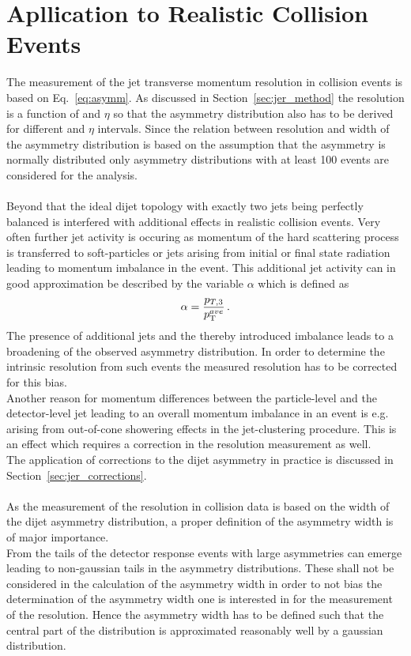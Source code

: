 \section{Apllication to Realistic Collision Events}
\label{sec:jer_application}
The measurement of the jet transverse momentum resolution in collision events is based on Eq.~\ref{eq:asymm}. As discussed in Section~\ref{sec:jer_method} the resolution is a function of \pt and $\eta$ so that the asymmetry distribution also has to be derived for different \pt and $\eta$ intervals. Since the relation between resolution and width of the asymmetry distribution is based on the assumption that the asymmetry is normally distributed only asymmetry distributions with at least 100 events are considered for the analysis. \\
\\
Beyond that the ideal dijet topology with exactly two jets being perfectly balanced is interfered with additional effects in realistic collision events. Very often further jet activity is occuring as momentum of the hard scattering process is transferred to soft-particles or jets arising from initial or final state radiation leading to momentum imbalance in the event. This additional jet activity can in good approximation be described by the variable $\alpha$ which is defined as
 \begin{equation}
\label{eq:alpha}
\alpha = \frac{p_{T,3}}{p_{\text{T}}^{ave}} \, .
\end{equation}
The presence of additional jets and the thereby introduced imbalance leads to a broadening of the observed asymmetry distribution. In order to determine the intrinsic resolution from such events the measured resolution has to be corrected for this bias. \\
Another reason for momentum differences between the particle-level and the detector-level jet leading to an overall momentum imbalance in an event is e.g. arising from out-of-cone showering effects in the jet-clustering procedure. This is an effect which requires a correction in the resolution measurement as well.\\
The application of corrections to the dijet asymmetry in practice is discussed in Section~\ref{sec:jer_corrections}.\\
\\
As the measurement of the resolution in collision data is based on the width of the dijet asymmetry distribution, a proper definition of the asymmetry width is of major importance.\\
From the tails of the detector response events with large asymmetries can emerge leading to non-gaussian tails in the asymmetry distributions. These shall not be considered in the calculation of the asymmetry width in order to not bias the determination of the asymmetry width one is interested in for the measurement of the resolution. Hence the asymmetry width has to be defined such that the central part of the distribution is approximated reasonably well by a gaussian distribution. 
